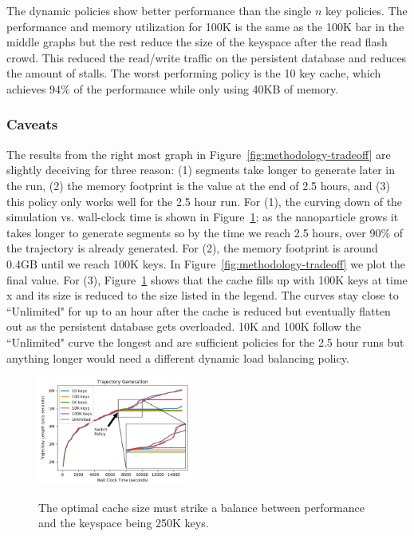 The dynamic policies show better performance than the single \(n\) key
policies. The performance and memory utilization for 100K is the same as the
100K bar in the middle graphs but the rest reduce the size of the keyspace
after the read flash crowd. This reduced the read/write traffic on the
persistent database and reduces the amount of stalls.  The worst performing
policy is the 10 key cache, which achieves 94\% of the performance while only
using 40KB of memory. 

\subsubsection*{Caveats}

The results from the right most graph in Figure~\ref{fig:methodology-tradeoff}
are slightly deceiving for three reason: (1) segments take longer to generate
later in the run, (2) the memory footprint is the value at the end of 2.5
hours, and (3) this policy only works well for the 2.5 hour run.  For (1), the
curving down of the simulation vs. wall-clock time is shown in
Figure~\ref{fig:methodology-trajectory}; as the nanoparticle grows it takes
longer to generate segments so by the time we reach 2.5 hours, over 90\% of the
trajectory is already generated.  For (2), the memory footprint is around 0.4GB
until we reach 100K keys. In Figure~\ref{fig:methodology-tradeoff} we plot the
final value. For (3), Figure~\ref{fig:methodology-trajectory} shows that the
cache fills up with 100K keys at time x and its size is reduced to the size
listed in the legend.  The curves stay close to ``Unlimited" for up to an hour
after the cache is reduced but eventually flatten out as the persistent
database gets overloaded. 10K and 100K follow the ``Unlimited" curve the
longest and are sufficient policies for the 2.5 hour runs but anything longer
would need a different dynamic load balancing policy.

\begin{figure}[tbh]
  \noindent\includegraphics[width=0.45\textwidth]{figures/methodology-trajectory.png}\\
  \caption{The optimal cache size must strike a balance between performance and
  the keyspace being 250K keys. \label{fig:methodology-trajectory}}
\end{figure}

